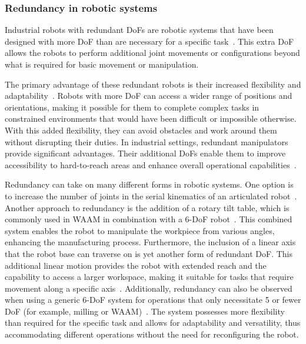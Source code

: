 \subsubsection{Redundancy in robotic systems}

Industrial robots with redundant \acrshort{DoF}s are robotic systems that have been designed with more \acrshort{DoF} than are necessary for a specific task~\cite{Wang.2022}. This extra \acrshort{DoF} allows the robots to perform additional joint movements or configurations beyond what is required for basic movement or manipulation.

The primary advantage of these redundant robots is their increased flexibility and adaptability~\cite{Duong.2021}. Robots with more \acrshort{DoF} can access a wider range of positions and orientations, making it possible for them to complete complex tasks in constrained environments that would have been difficult or impossible otherwise. With this added flexibility, they can avoid obstacles and work around them without disrupting their duties. In industrial settings, redundant manipulators provide significant advantages. Their additional \acrshort{DoF}s enable them to improve accessibility to hard-to-reach areas and enhance overall operational capabilities~\cite{Shi.2021}. 

Redundancy can take on many different forms in robotic systems. One option is to increase the number of joints in the serial kinematics of an articulated robot~\cite{Milenkovic.2021}. Another approach to redundancy is the addition of a rotary tilt table, which is commonly used in \acrshort{WAAM} in combination with a 6-\acrshort{DoF} robot~\cite{Yuan.2020}. This combined system enables the robot to manipulate the workpiece from various angles, enhancing the manufacturing process.
Furthermore, the inclusion of a linear axis that the robot base can traverse on is yet another form of redundant \acrshort{DoF}. This additional linear motion provides the robot with extended reach and the capability to access a larger workspace, making it suitable for tasks that require movement along a specific axis~\cite{Boscariol.2019}.
Additionally, redundancy can also be observed when using a generic 6-\acrshort{DoF} system for operations that only necessitate 5 or fewer \acrshort{DoF} (for example, milling or \acrshort{WAAM})~\cite{Hanafusa.1981,Wang.2022}. The system possesses more flexibility than required for the specific task and allows for adaptability and versatility, thus accommodating different operations without the need for reconfiguring the robot.



